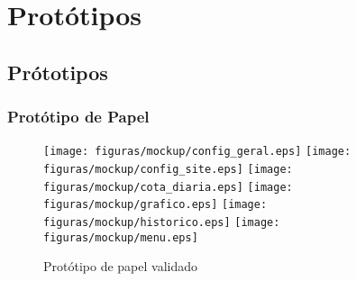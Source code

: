 \part[Protótipos]{Protótipos}

\chapter[Prótotipos]{Prótotipos}

\section[Protótipo de Papel]{Protótipo de Papel}

\begin{figure}[h]
	\centering
	\label{fig03}
		\texttt{[image: figuras/mockup/config\_geral.eps]}
		\texttt{[image: figuras/mockup/config\_site.eps]}
		\texttt{[image: figuras/mockup/cota\_diaria.eps]}
		\texttt{[image: figuras/mockup/grafico.eps]}
		\texttt{[image: figuras/mockup/historico.eps]}
		\texttt{[image: figuras/mockup/menu.eps]}
	\caption{Protótipo de papel validado}
\end{figure}